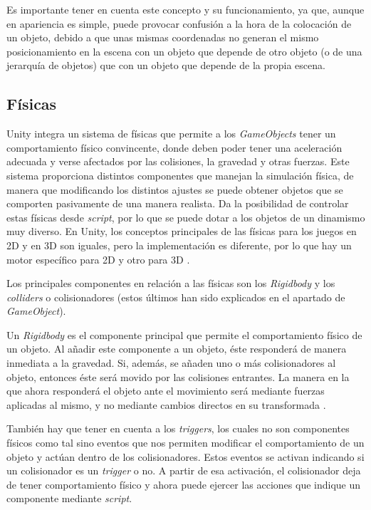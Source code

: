 Es importante tener en cuenta este concepto y su funcionamiento, ya que, aunque en apariencia es simple, puede provocar confusión a la hora de la colocación de un objeto, debido a que unas mismas coordenadas no generan el mismo posicionamiento en la escena con un objeto que depende de otro objeto (o de una jerarquía de objetos) que con un objeto que depende de la propia escena.

\subsection{Físicas}

Unity integra un sistema de físicas que permite a los \textit{GameObjects} tener un comportamiento físico convincente, donde deben poder tener una aceleración adecuada y verse afectados por las colisiones, la gravedad y otras fuerzas. Este sistema proporciona distintos componentes que manejan la simulación física, de manera que modificando los distintos ajustes se puede obtener objetos que se comporten pasivamente de una manera realista. Da la posibilidad de controlar estas físicas desde \textit{script}, por lo que se puede dotar a los objetos de un dinamismo muy diverso. En Unity, los conceptos principales de las físicas para los juegos en 2D y en 3D son iguales, pero la implementación es diferente, por lo que hay un motor específico para 2D y otro para 3D \cite{doc:physics}.

Los principales componentes en relación a las físicas son los \textit{Rigidbody} y los \textit{colliders} o colisionadores (estos últimos han sido explicados en el apartado de \textit{GameObject}). 

Un \textit{Rigidbody} es el componente principal que permite el comportamiento físico de un objeto. Al añadir este componente a un objeto, éste responderá de manera inmediata a la gravedad. Si, además, se añaden uno o más colisionadores al objeto, entonces éste será movido por las colisiones entrantes. La manera en la que ahora responderá el objeto ante el movimiento será mediante fuerzas aplicadas al mismo, y no mediante cambios directos en su transformada \cite{doc:rigidbody}.

También hay que tener en cuenta a los \textit{triggers}, los cuales no son componentes físicos como tal sino eventos que nos permiten modificar el comportamiento de un objeto y actúan dentro de los colisionadores. Estos eventos se activan indicando si un colisionador es un \textit{trigger} o no. A partir de esa activación, el colisionador deja de tener comportamiento físico y ahora puede ejercer las acciones que indique un componente mediante \textit{script}.

